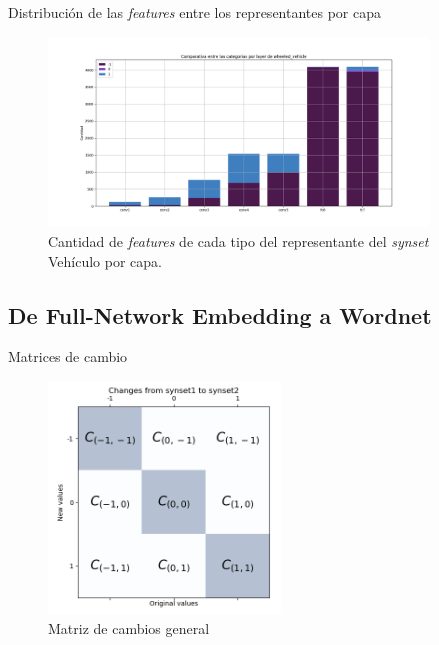 \documentclass{beamer}
\begin{document}
\begin{frame}{Distribución de las \textit{features} entre los representantes por capa}
\begin{figure}[ht] 
	\centering
	\includegraphics[width=0.9\textwidth] {Images/plots/25/synsetslayer/Comparative_of_synsets_wheeled_vehicle.png}
	\caption{ Cantidad de \textit{features} de cada tipo del representante del \textit{synset} Vehículo por capa.
	\label{fig:comparativaVehiculo}}
\end{figure}
\end{frame}




\subsection{De Full-Network Embedding a Wordnet}
\begin{frame}{Matrices de cambio}
 \begin{figure}[ht] 
	\centering
	\includegraphics[width=0.55\textwidth] {Images/plots/25/matrices/Changesfromsynset1tosynset2.png}
	\caption{ Matriz de cambios general
	\label{fig:matrizss1ss2}}
\end{figure}
\end{frame}
\end{document}
